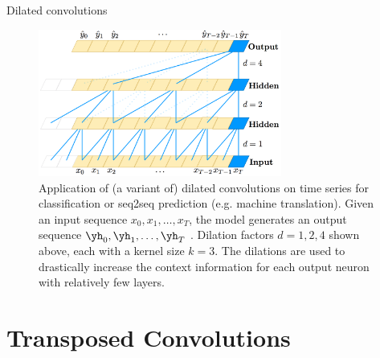 \begin{vbframe}{Dilated convolutions}
    \begin{figure}
        \centering
        \includegraphics[width=8cm]{plots/05_conv_variations/dilated/tcn.png}
        \caption{Application of (a variant of) dilated convolutions on time series for classification or seq2seq prediction (e.g. machine translation). Given an input sequence $x_0,x_1, \ldots, x_T$, the model generates an output sequence $\yh_0,\yh_1, \ldots, \yh_T$ . Dilation factors $d = 1, 2, 4$ shown above, each with a kernel size $k = 3$. The dilations are used to drastically increase the context information for each output neuron with relatively few layers.}
    \end{figure}

\end{vbframe}

\section{Transposed Convolutions}


